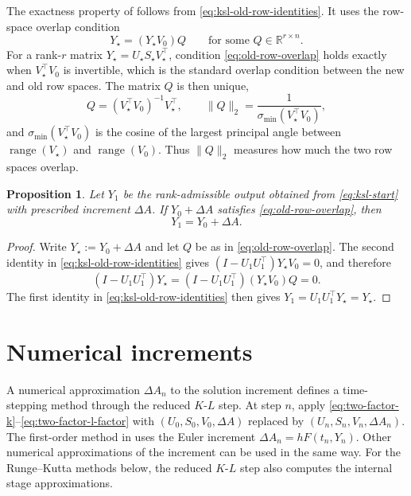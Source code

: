\documentclass[]{article}
\numberwithin{equation}{section}
\theoremstyle{plain}
\newtheorem{proposition}[theorem]{Proposition}
\theoremstyle{remark}
\numberwithin{algorithm}{section}
\newcommand{\R}{\mathbb{R}}
\newcommand{\range}{\operatorname{range}}
\begin{document}
The exactness property of \cite[Theorem~4.1]{LubichOseledets2014} follows
from \eqref{eq:ksl-old-row-identities}.  It uses the row-space overlap
condition
\begin{equation}\label{eq:old-row-overlap}
 Y_\star=(Y_\star V_0)Q
 \qquad\text{for some }Q\in\R^{r\times n}.
\end{equation}
For a rank-\(r\) matrix \(Y_\star=U_\star S_\star V_\star^\top\), condition
\eqref{eq:old-row-overlap} holds exactly when \(V_\star^\top V_0\) is
invertible, which is the standard overlap condition between the new and old
row spaces.  The matrix \(Q\) is then unique,
\begin{equation}\label{eq:overlap-matrix}
 Q=(V_\star^\top V_0)^{-1}V_\star^\top,
 \qquad
 \|Q\|_2=\frac{1}{\sigma_{\min}(V_\star^\top V_0)},
\end{equation}
and \(\sigma_{\min}(V_\star^\top V_0)\) is the cosine of the largest
principal angle between \(\range(V_\star)\) and \(\range(V_0)\).  Thus
\(\|Q\|_2\) measures how much the two row spaces overlap.

\begin{proposition}
\label{prop:exactness}
Let \(Y_1\) be the rank-admissible output obtained from
\eqref{eq:ksl-start} with prescribed increment \(\Delta A\).  If
\(Y_0+\Delta A\) satisfies \eqref{eq:old-row-overlap}, then
\[
 Y_1=Y_0+\Delta A.
\]
\end{proposition}

\begin{proof}
Write \(Y_\star:=Y_0+\Delta A\) and let \(Q\) be as in
\eqref{eq:old-row-overlap}.  The second identity in
\eqref{eq:ksl-old-row-identities} gives
\((I-U_1U_1^\top)Y_\star V_0=0\), and therefore
\[
 (I-U_1U_1^\top)Y_\star=(I-U_1U_1^\top)(Y_\star V_0)Q=0.
\]
The first identity in \eqref{eq:ksl-old-row-identities} then gives
\(Y_1=U_1U_1^\top Y_\star=Y_\star\).
\end{proof}

\section{Numerical increments}
\label{sec:increments}

A numerical approximation \(\Delta A_n\) to the solution increment
defines a time-stepping method through the reduced \(K\)-\(L\) step.  At step
\(n\), apply \eqref{eq:two-factor-k}--\eqref{eq:two-factor-l-factor} with
\((U_0,S_0,V_0,\Delta A)\) replaced by
\((U_n,S_n,V_n,\Delta A_n)\).
The first-order method in \cite{LubichOseledets2014} uses the Euler
increment \(\Delta A_n=hF(t_n,Y_n)\).  Other numerical approximations of
the increment can be used in the same way.  For the Runge--Kutta methods
below, the reduced \(K\)-\(L\) step also computes the internal stage approximations.
\end{document}
